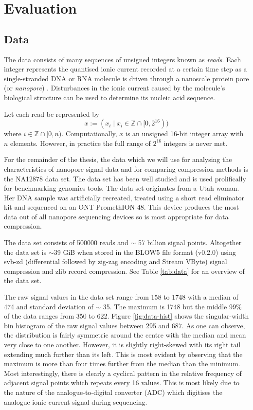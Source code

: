 \chapter{Evaluation} \label{chap:evaluation}

\section{Data} \label{sec:data}

The data consists of many sequences of unsigned integers known as \textit{reads}. Each integer represents the quantised ionic current recorded at a certain time step as a single-stranded DNA or RNA molecule is driven through a nanoscale protein pore (or \textit{nanopore}) \cite{Wang2021}. Disturbances in the ionic current caused by the molecule's biological structure can be used to determine its nucleic acid sequence.

Let each read be represented by
\[ x := (x_i\mid x_i \in \mathbb{Z} \cap [0, 2^{16})) \]
where $i\in \mathbb{Z}\cap [0, n)$. Computationally, $x$ is an unsigned 16-bit integer array with $n$ elements. However, in practice the full range of $2^{16}$ integers is never met.

For the remainder of the thesis, the data which we will use for analysing the characteristics of nanopore signal data and for comparing compression methods is the NA12878 data set. The data set has been well studied and is used prolifically for benchmarking genomics tools. The data set originates from a Utah woman. Her DNA sample was artificially recreated, treated using a short read eliminator kit and sequenced on an ONT PromethION 48. This device produces the most data out of all nanopore sequencing devices so is most appropriate for data compression.

The data set consists of \num{500000} reads and $\sim$ 57 billion signal points. Altogether the data set is $\sim$39 GiB when stored in the BLOW5 file format (v0.2.0) using svb-zd (differential followed by zig-zag encoding and Stream VByte) signal compression and zlib record compression. See Table \ref{tab:data} for an overview of the data set.



The raw signal values in the data set range from 158 to 1748 with a median of 474 and standard deviation of $\sim$ 35. The maximum is 1748 but the middle 99\% of the data ranges from 350 to 622. Figure \ref{fig:data-hist} shows the singular-width bin histogram of the raw signal values between 295 and 687.
As one can observe, the distribution is fairly symmetric around the centre with the median and mean very close to one another. However, it is slightly right-skewed with its right tail extending much further than its left. This is most evident by observing that the maximum is more than four times further from the median than the minimum.
Most interestingly, there is clearly a cyclical pattern in the relative frequency of adjacent signal points which repeats every 16 values.
This is most likely due to the nature of the analogue-to-digital converter (ADC) which digitises the analogue ionic current signal during sequencing.

